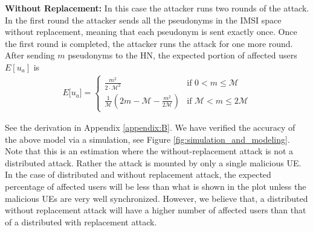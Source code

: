 \documentclass{llncs} %
\begin{document}
  

\textbf{Without Replacement:} In this case the attacker runs two rounds of the attack. In the first round the attacker sends all the pseudonyms in the IMSI space without replacement, meaning that each pseudonym is sent exactly once. Once the first round is completed, the attacker runs the attack for one more round. After sending $m$ pseudonyms to the HN, the expected
 portion of affected users $E[u_a]$ is
\begin{eqnarray}
E\big[ u_a \big] = \begin{cases} \frac{m^2}{2\cdot \mathcal{M}^2} & \mbox{if } 0 < m \leq \mathcal{M} \\ 
\frac{1}{\mathcal{M}}(2m - \mathcal{M} - \frac{m^2}{2\mathcal{M}}) & \mbox{if } \mathcal{M} < m \leq 2\mathcal{M} \end{cases}
\label{eqn:without_replacement}
\end{eqnarray} 

See the derivation in Appendix \ref{appendix:B}. We have verified the accuracy of the above model via a simulation, see Figure \ref{fig:simulation_and_modeling}. Note that this is an estimation where the without-replacement attack is not a distributed attack. Rather the attack is mounted by only a single malicious UE. In the case of distributed and without replacement attack, the expected percentage of affected users will be less than what is shown in the plot unless the malicious UEs are very well synchronized. However, we believe that, a distributed without replacement attack will have a higher number of affected users than that of a distributed with replacement attack. %
\end{document}

